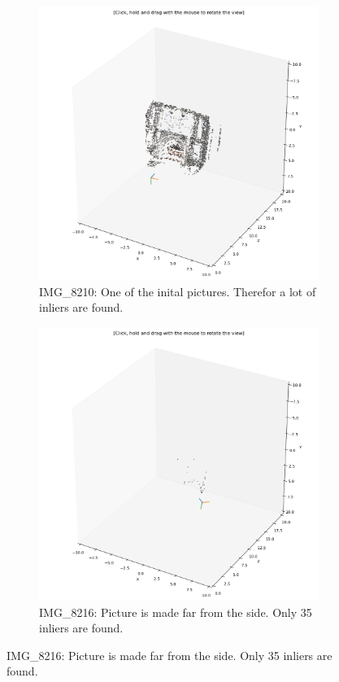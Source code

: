 \documentclass[a4paper]{article} %
\begin{document}
    \begin{figure}[H]
        \centering
        \begin{subfigure}[b]{0.45\textwidth}
         \centering
         \includegraphics[width=\textwidth]{matches_many}
         \caption{IMG\_8210: One of the inital pictures. Therefor a lot of inliers are found. }
     \end{subfigure}
     \hfill
     \begin{subfigure}[b]{0.45\textwidth}
         \centering
         \includegraphics[width=\textwidth]{matches_few}
         \caption{IMG\_8216: Picture is made far from the side. Only 35 inliers are found. }
     \end{subfigure}
    \end{figure}
\end{document}
